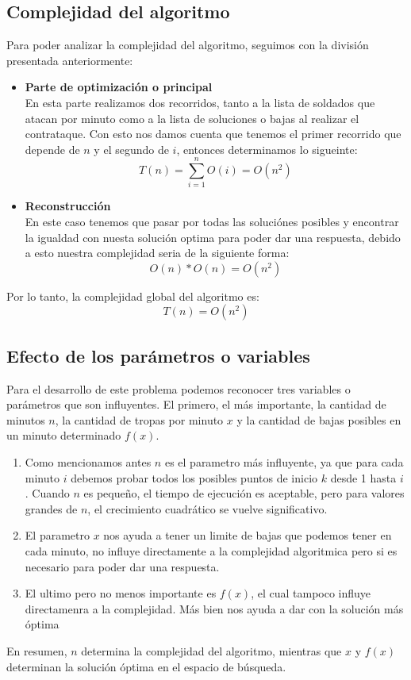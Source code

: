 \subsection{Complejidad del algoritmo}
Para poder analizar la complejidad del algoritmo, seguimos con la división presentada anteriormente:
\begin{itemize}
    \item \textbf{Parte de optimización o principal}\\
    En esta parte realizamos dos recorridos, tanto a la lista de soldados que atacan por minuto como a la lista de soluciones o bajas al realizar el contrataque. Con esto nos damos cuenta que tenemos el primer recorrido que depende de $n$ y el segundo de $i$, entonces determinamos lo sigueinte:
        \[T(n) = \sum_{i=1}^{n} O(i) = O(n^2)\]
    
    \item \textbf{Reconstrucción}\\
    En este caso tenemos que pasar por todas las soluciónes posibles y encontrar la igualdad con nuesta solución optima para poder dar una respuesta, debido a esto nuestra complejidad seria de la siguiente forma:
        \[O(n) * O(n) = O(n^2)\]
\end{itemize}

Por lo tanto, la complejidad global del algoritmo es:\[T(n) = O(n^2)\]

\subsection{Efecto de los parámetros o variables}

Para el desarrollo de este problema podemos reconocer tres variables o parámetros que son influyentes. El primero, el más importante, la cantidad de minutos $n$, la cantidad de tropas por minuto $x$ y la cantidad de bajas posibles en un minuto determinado $f(x)$.
\begin{enumerate}
    \item Como mencionamos antes $n$ es el parametro más influyente, ya que para cada minuto $i$ debemos probar todos los posibles puntos de inicio $k$ desde 1 hasta $i$. Cuando $n$ es pequeño, el tiempo de ejecución es aceptable, pero para valores grandes de $n$, el crecimiento cuadrático se vuelve significativo.
    \item El parametro $x$ nos ayuda a tener un limite de bajas que podemos tener en cada minuto, no influye directamente a la complejidad algoritmica pero si es necesario para poder dar una respuesta.
    \item El ultimo pero no menos importante es $f(x)$, el cual tampoco influye directamenra a la complejidad. Más bien nos ayuda a dar con la solución más óptima 
\end{enumerate}
En resumen, $n$ determina la complejidad del algoritmo, mientras que $x$ y $f(x)$ determinan la solución óptima en el espacio de búsqueda. 